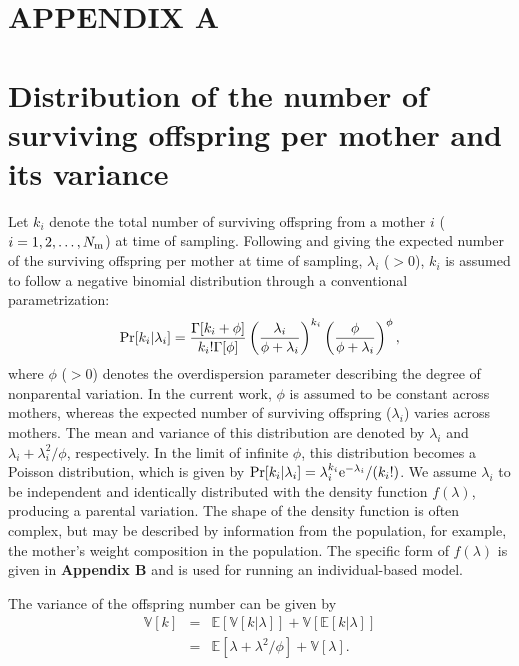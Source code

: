 \documentclass[12pt, English]{article}
\begin{document}
\begin{spacing}{1.9}
\section*{APPENDIX A}
\setcounter{equation}{0}

\section*{Distribution of the number of surviving offspring per mother and its variance}

\renewcommand{\theequation}{A\arabic{equation}}

Let $k_i$ denote the total number of surviving offspring from a mother  $i$ ($i= 1, 2, \dots, N_{\rm m}$) at time of sampling. Following \cite{Akita_2019} and giving the expected number of the surviving offspring per mother at time of sampling, $\lambda_i$ ($>0$), $k_i$ is assumed to follow a negative binomial distribution through a conventional parametrization:
\begin{equation}
{\rm Pr}[ k_i | \lambda_i ] = \frac{\Gamma[k_i+\phi]}{k_i! \Gamma[\phi]} \left( \frac{\lambda_i}{\phi+\lambda_i} \right)^{k_i} \left( \frac{\phi}{\phi+\lambda_i} \right)^{\phi}, 
\label{NB}
\end{equation}
where $\phi$ ($>0$) denotes the overdispersion parameter describing the degree of nonparental variation. In the current work, $\phi$ is assumed to be constant across mothers, whereas the expected number of surviving offspring ($\lambda_i$) varies across mothers. The mean and variance of this distribution are denoted by $\lambda_i$ and $\lambda_i + \lambda_i^2/\phi$, respectively. In the limit of infinite $\phi$, this distribution becomes a Poisson distribution, which is given by ${\rm Pr}[ k_i | \lambda_i ]=\lambda_i^{k_i} \mathrm{e}^{-\lambda_i}/(k_i!)$. We assume $\lambda_i$ to be independent and identically distributed with the density function $f(\lambda)$, producing a parental variation. The shape of the density function is often complex, but may be described by information from the population, for example, the mother's weight composition in the population. The specific form of $f(\lambda)$ is given in {\bf Appendix B} and is used for running an individual-based model.  

The variance of the offspring number can be given by 
\begin{eqnarray}
\mathbb{V}[k] &=& \mathbb{E}[ \mathbb{V}[k|\lambda] ] + \mathbb{V}[ \mathbb{E}[k|\lambda] ] \nonumber\\
&=& \mathbb{E}[ \lambda + \lambda^2 / \phi ] + \mathbb{V}[ \lambda ].
\label{V_k}
\end{eqnarray}


\end{spacing}
\end{document}
